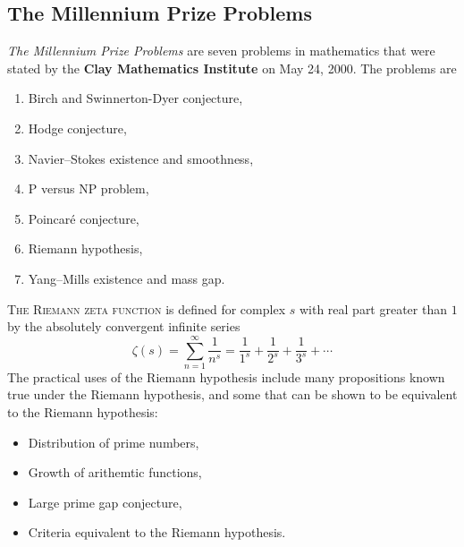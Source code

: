 \subsection{The Millennium Prize Problems}
\emph{The Millennium Prize Problems} are seven problems in mathematics that were stated by the \textbf{Clay Mathematics Institute} on May 24, 2000. The problems are
\begin{enumerate}[(1)]
  \item Birch and Swinnerton-Dyer conjecture,
  \item Hodge conjecture,
  \item Navier–Stokes existence and smoothness,
  \item P versus NP problem,
  \item Poincaré conjecture,
  \item Riemann hypothesis,
  \item Yang–Mills existence and mass gap.
\end{enumerate}
\textsc{The Riemann zeta function} is defined for complex $s$ with real part greater than $1$ by the absolutely convergent infinite series
$$
\zeta(s) = \sum_{n=1}^{\infty} \frac{1}{n^s} = \frac{1}{1^s} + \frac{1}{2^s} + \frac{1}{3^s} + \cdots
$$
The practical uses of the Riemann hypothesis include many propositions known true under the Riemann hypothesis, and some that can be shown to be equivalent to the Riemann hypothesis:
\begin{itemize}
  \item Distribution of prime numbers,
  \item Growth of arithemtic functions,
  \item Large prime gap conjecture,
  \item Criteria equivalent to the Riemann hypothesis.
\end{itemize}
